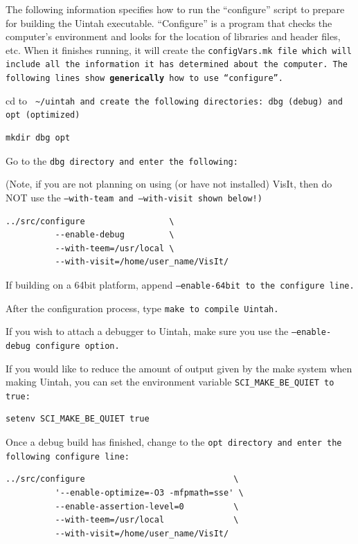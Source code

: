\documentclass[12pt]{article}
\newcommand{\TT}[1]{\tt{#1} \normalfont}
\begin{document}
The following information specifies how to run the ``configure''
script to prepare for building the Uintah executable.  ``Configure''
is a program that checks the computer's environment and looks for the
location of libraries and header files, etc.  When it finishes
running, it will create the \TT{configVars.mk} file which will include all
the information it has determined about the computer.  The following
lines show \textbf{generically} how to use ``configure''.

cd to \TT{ \textasciitilde/uintah} and create the following directories:
\TT{dbg} (debug) and \TT{opt} (optimized)

\begin{verbatim}
mkdir dbg opt
\end{verbatim}

Go to the \TT{dbg} directory and enter the following:

(Note, if you are not planning on using (or have not installed) VisIt,
then do NOT use the \TT{--with-team} and \TT{--with-visit} shown below!)

\begin{verbatim}
../src/configure                 \
          --enable-debug         \
          --with-teem=/usr/local \
          --with-visit=/home/user_name/VisIt/
\end{verbatim}

If building on a 64bit platform, append \TT{--enable-64bit} to the
configure line.

After the configuration process, type \TT{make} to compile Uintah.

If you wish to attach a debugger to Uintah, make sure you use the \TT{--enable-debug} configure option.

If you would like to reduce the amount of output given by the make system when making Uintah, 
you can set the environment variable \TT{SCI\_MAKE\_BE\_QUIET} to true:

\begin{verbatim}
setenv SCI_MAKE_BE_QUIET true
\end{verbatim}

Once a debug build has finished, change to the \TT{opt} directory and
enter the following configure line:

\begin{verbatim}
../src/configure                              \
          '--enable-optimize=-O3 -mfpmath=sse' \
          --enable-assertion-level=0          \
          --with-teem=/usr/local              \
          --with-visit=/home/user_name/VisIt/
\end{verbatim}
\end{document}
